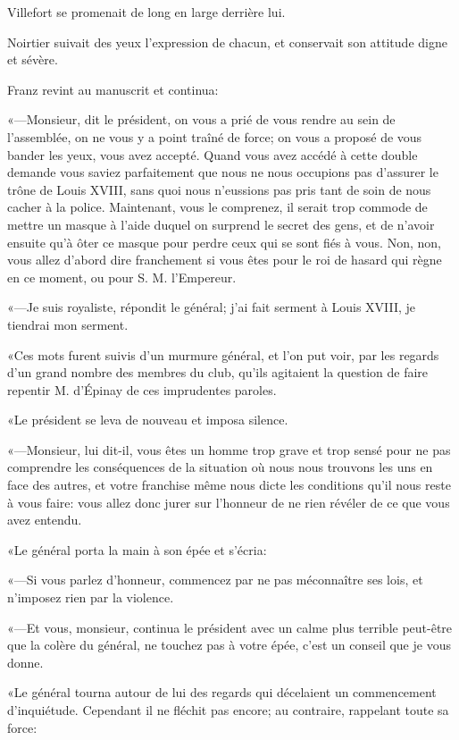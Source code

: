 Villefort se promenait de long en large derrière lui. 

Noirtier suivait des yeux l'expression de chacun, et conservait son attitude digne et sévère. 

Franz revint au manuscrit et continua: 

«—Monsieur, dit le président, on vous a prié de vous rendre au sein de l'assemblée, on ne vous y a point traîné de force; on vous a proposé de vous bander les yeux, vous avez accepté. Quand vous avez accédé à cette double demande vous saviez parfaitement que nous ne nous occupions pas d'assurer le trône de Louis XVIII, sans quoi nous n'eussions pas pris tant de soin de nous cacher à la police. Maintenant, vous le comprenez, il serait trop commode de mettre un masque à l'aide duquel on surprend le secret des gens, et de n'avoir ensuite qu'à ôter ce masque pour perdre ceux qui se sont fiés à vous. Non, non, vous allez d'abord dire franchement si vous êtes pour le roi de hasard qui règne en ce moment, ou pour S. M. l'Empereur. 

«—Je suis royaliste, répondit le général; j'ai fait serment à Louis XVIII, je tiendrai mon serment. 

«Ces mots furent suivis d'un murmure général, et l'on put voir, par les regards d'un grand nombre des membres du club, qu'ils agitaient la question de faire repentir M. d'Épinay de ces imprudentes paroles. 

«Le président se leva de nouveau et imposa silence. 

«—Monsieur, lui dit-il, vous êtes un homme trop grave et trop sensé pour ne pas comprendre les conséquences de la situation où nous nous trouvons les uns en face des autres, et votre franchise même nous dicte les conditions qu'il nous reste à vous faire: vous allez donc jurer sur l'honneur de ne rien révéler de ce que vous avez entendu. 

«Le général porta la main à son épée et s'écria: 

«—Si vous parlez d'honneur, commencez par ne pas méconnaître ses lois, et n'imposez rien par la violence. 

«—Et vous, monsieur, continua le président avec un calme plus terrible peut-être que la colère du général, ne touchez pas à votre épée, c'est un conseil que je vous donne. 

«Le général tourna autour de lui des regards qui décelaient un commencement d'inquiétude. Cependant il ne fléchit pas encore; au contraire, rappelant toute sa force: 

